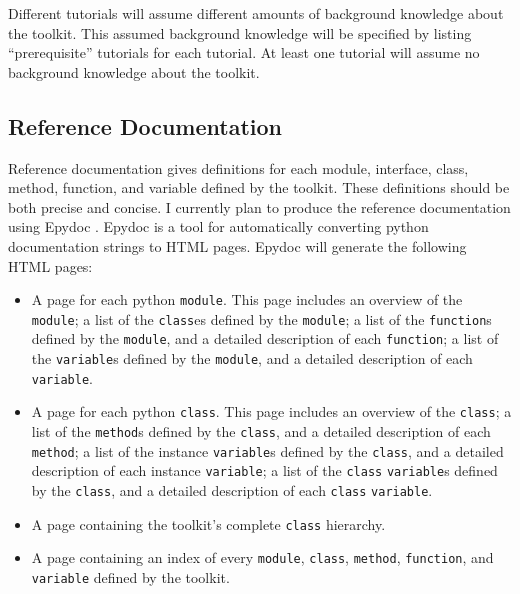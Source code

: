 \documentclass{article}
\begin{document}
Different tutorials will assume different amounts of background
knowledge about the toolkit.  This assumed background knowledge will
be specified by listing ``prerequisite'' tutorials for each tutorial.
At least one tutorial will assume no background knowledge about the
toolkit.

\subsection{Reference Documentation}

Reference documentation gives definitions for each module, interface,
class, method, function, and variable defined by the toolkit.  These
definitions should be both precise and concise.  I currently plan to
produce the reference documentation using Epydoc \cite{epydoc}.
Epydoc is a tool for automatically converting python documentation
strings to HTML pages.  Epydoc will generate the following HTML pages:

\begin{itemize}
  \item A page for each python \texttt{module}.  This page includes an
  overview of the \texttt{module}; a list of the \texttt{class}es
  defined by the \texttt{module}; a list of the \texttt{function}s
  defined by the \texttt{module}, and a detailed description of each
  \texttt{function}; a list of the \texttt{variable}s defined by the
  \texttt{module}, and a detailed description of each
  \texttt{variable}.

  \item A page for each python \texttt{class}.  This page includes an
  overview of the \texttt{class}; a list of the \texttt{method}s
  defined by the \texttt{class}, and a detailed description of each
  \texttt{method}; a list of the instance \texttt{variable}s defined
  by the \texttt{class}, and a detailed description of each instance
  \texttt{variable}; a list of the \texttt{class} \texttt{variable}s
  defined by the \texttt{class}, and a detailed description of each
  \texttt{class} \texttt{variable}.

  \item A page containing the toolkit's complete \texttt{class}
  hierarchy.

  \item A page containing an index of every \texttt{module},
  \texttt{class}, \texttt{method}, \texttt{function}, and
  \texttt{variable} defined by the toolkit.

\end{itemize}
\end{document}
